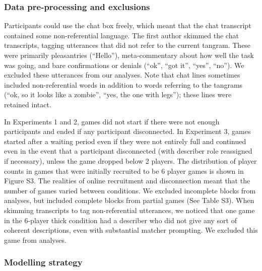 \documentclass[9pt,twocolumn,twoside]{pnas-new}
\begin{document}
{\subsubsection*{Data pre-processing and
exclusions}\label{data-pre-processing-and-exclusions}

Participants could use the chat box freely, which meant that the chat
transcript contained some non-referential language. The first author
skimmed the chat transcripts, tagging utterances that did not refer to
the current tangram. These were primarily pleasantries (``Hello''),
meta-commentary about how well the task was going, and bare
confirmations or denials (``ok'', ``got it'', ``yes'', ``no''). We
excluded these utterances from our analyses. Note that chat lines
sometimes included non-referential words in addition to words referring
to the tangrams (``ok, so it looks like a zombie'', ``yes, the one with
legs''); these lines were retained intact.

In Experiments 1 and 2, games did not start if there were not enough
participants and ended if any participant disconnected. In Experiment 3,
games started after a waiting period even if they were not entirely full
and continued even in the event that a participant disconnected (with
describer role reassigned if necessary), unless the game dropped below 2
players. The distribution of player counts in games that were initially
recruited to be 6 player games is shown in Figure S3. The realities of
online recruitment and disconnection meant that the number of games
varied between conditions. We excluded incomplete blocks from analyses,
but included complete blocks from partial games (See Table S3). When
skimming transcripts to tag non-referential utterances, we noticed that
one game in the 6-player thick condition had a describer who did not
give any sort of coherent descriptions, even with substantial matcher
prompting. We excluded this game from analyses.

\subsubsection*{Modelling strategy}\label{modelling-strategy}

}
\end{document}
